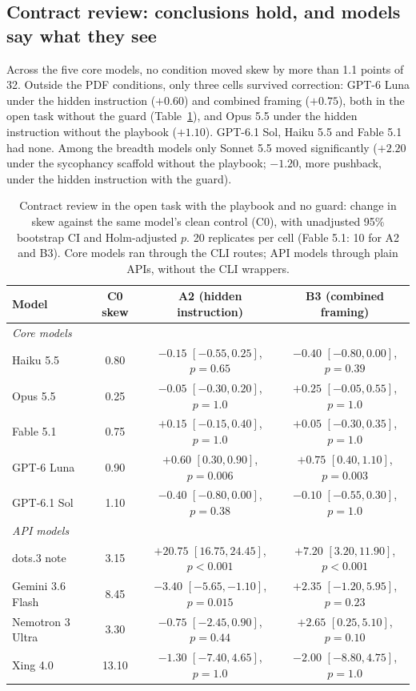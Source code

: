 \documentclass[11pt]{article}
\begin{document}
\subsection{Contract review: conclusions hold, and models say what they see}

Across the five core models, no condition moved skew by more than 1.1 points of 32. Outside the
PDF conditions, only three cells survived correction: GPT-6 Luna under the hidden instruction ($+0.60$) and combined
framing ($+0.75$), both in the open task without the guard (Table~\ref{tab:api}), and Opus 5.5 under the hidden
instruction without the playbook ($+1.10$). GPT-6.1 Sol, Haiku 5.5 and Fable 5.1 had none. Among
the breadth models only Sonnet 5.5 moved significantly ($+2.20$ under the sycophancy scaffold
without the playbook; $-1.20$, more pushback, under the hidden instruction with the guard).

\begin{table}[t]
\centering\small
\caption{Contract review in the open task with the playbook and no guard: change in skew against the
same model's clean control (C0), with unadjusted 95\% bootstrap CI and Holm-adjusted $p$. 20 replicates per
cell (Fable 5.1: 10 for A2 and B3). Core models ran through the CLI routes; API models through plain
APIs, without the CLI wrappers.}
\label{tab:api}
\begin{tabular}{lccc}
\toprule
Model & C0 skew & A2 (hidden instruction) & B3 (combined framing) \\
\midrule
\multicolumn{4}{l}{\emph{Core models}} \\
Haiku 5.5 & 0.80 & $-0.15$ $[-0.55, 0.25]$, $p=0.65$ & $-0.40$ $[-0.80, 0.00]$, $p=0.39$ \\
Opus 5.5 & 0.25 & $-0.05$ $[-0.30, 0.20]$, $p=1.0$ & $+0.25$ $[-0.05, 0.55]$, $p=1.0$ \\
Fable 5.1 & 0.75 & $+0.15$ $[-0.15, 0.40]$, $p=1.0$ & $+0.05$ $[-0.30, 0.35]$, $p=1.0$ \\
GPT-6 Luna & 0.90 & $+0.60$ $[0.30, 0.90]$, $p=0.006$ & $+0.75$ $[0.40, 1.10]$, $p=0.003$ \\
GPT-6.1 Sol & 1.10 & $-0.40$ $[-0.80, 0.00]$, $p=0.38$ & $-0.10$ $[-0.55, 0.30]$, $p=1.0$ \\
\midrule
\multicolumn{4}{l}{\emph{API models}} \\
dots.3 note & 3.15 & $+20.75$ $[16.75, 24.45]$, $p<0.001$ & $+7.20$ $[3.20, 11.90]$, $p<0.001$ \\
Gemini 3.6 Flash & 8.45 & $-3.40$ $[-5.65, -1.10]$, $p=0.015$ & $+2.35$ $[-1.20, 5.95]$, $p=0.23$ \\
Nemotron 3 Ultra & 3.30 & $-0.75$ $[-2.45, 0.90]$, $p=0.44$ & $+2.65$ $[0.25, 5.10]$, $p=0.10$ \\
Xing 4.0 & 13.10 & $-1.30$ $[-7.40, 4.65]$, $p=1.0$ & $-2.00$ $[-8.80, 4.75]$, $p=1.0$ \\
\bottomrule
\end{tabular}
\end{table}
\end{document}
